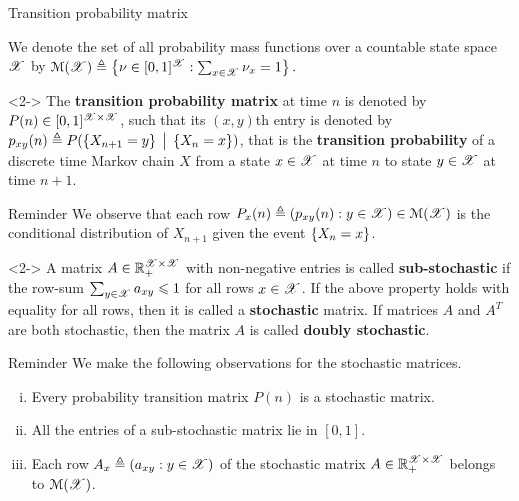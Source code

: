 \documentclass[12pt,aspectratio=169]{beamer}
\begin{document}
\begin{frame}{Transition probability matrix}
\begin{Definition}
We denote the set of all probability mass functions over a countable state space $\mathscr{X}$ by 
$
\mathcal{M}(\mathscr{X})\triangleq \left\{\nu \in [0,1]^{\mathscr{X}}: \sum_{x\in \mathscr{X}}\nu_x = 1\right\}. 
$
\end{Definition}
\begin{Definition}<2->
The \textbf{transition probability matrix} at time $n$ is denoted by $P(n) \in [0,1]^{\mathscr{X} \times \mathscr{X}}$, 
such that its $(x,y)$th entry is denoted by $p_{xy}(n) \triangleq P(\left\{X_{n+1} = y\right\}\; \big\vert \;\left\{X_n = x\right\})$, that is the \textbf{transition probability} of a discrete time Markov chain $X$ from a state $x \in \mathscr{X}$ at time $n$ to state $y \in \mathscr{X}$ at time $n+1$. 
\end{Definition}
\end{frame}

\begin{frame}
\begin{block}{Reminder}
We observe that each row $P_{x}(n) \triangleq (p_{xy}(n): y \in \mathscr{X}) \in\mathcal{M}(\mathscr{X})$ is the conditional distribution of $X_{n+1}$ given the event $\left\{X_n = x\right\}$. 
\end{block}

\begin{Definition}<2->
A matrix $A \in \mathbb{R}_+^{\mathscr{X} \times \mathscr{X}}$ with non-negative entries is called \textbf{sub-stochastic} if the row-sum $\sum_{y \in \mathscr{X}} a_{xy} \leqslant 1$ for all rows $x \in \mathscr{X}$. 
If the above property holds with equality for all rows, then it is called a \textbf{stochastic} matrix. 
If matrices $A$ and $A^T$ are both stochastic, then the matrix $A$ is called \textbf{doubly stochastic}. 
\end{Definition}
\end{frame}

\begin{frame}
\begin{block}{Reminder} 
We make the following observations for the stochastic matrices. 
\begin{enumerate}[(i)]
\item<2-> Every probability transition matrix $P(n)$ is a stochastic matrix. 
\item<3-> All the entries of a sub-stochastic matrix lie in $[0,1]$. 
\item<4-> Each row $A_x \triangleq (a_{xy}: y \in \mathscr{X})$ of the stochastic matrix $A \in \mathbb{R}_+^{\mathscr{X} \times \mathscr{X}}$ belongs to $\mathcal{M}(\mathscr{X})$. %
\end{enumerate}
\end{block}
\end{frame}
\end{document}
